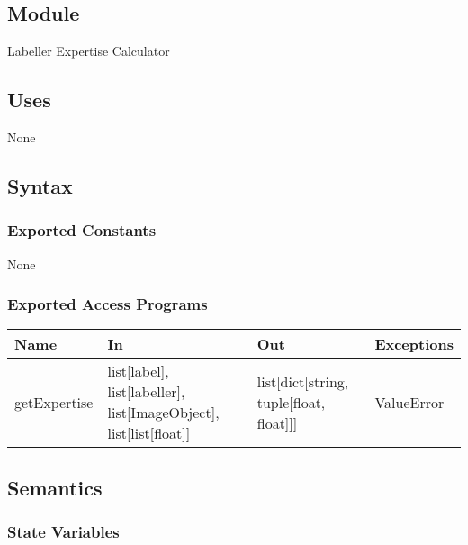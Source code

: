 \documentclass[12pt, titlepage]{article}
\begin{document}
  
  
  \subsection{Module}
  
  Labeller Expertise Calculator
  
  \subsection{Uses}
  
  None

  \subsection{Syntax}


  
  \subsubsection{Exported Constants}
  None
  \subsubsection{Exported Access Programs}
  
  \begin{center}
  \begin{tabular}{p{2cm} p{4cm} p{4cm} p{2cm}}
  \hline
  \textbf{Name} & \textbf{In} & \textbf{Out} & \textbf{Exceptions} \\
  \hline
  getExpertise & list[label], list[labeller], list[ImageObject], list[list[float]] & list[dict[string, tuple[float, float]]]  & ValueError \\
  
  \end{tabular}
  \end{center}
  
  \subsection{Semantics}
  
  \subsubsection{State Variables}
  
\end{document}
